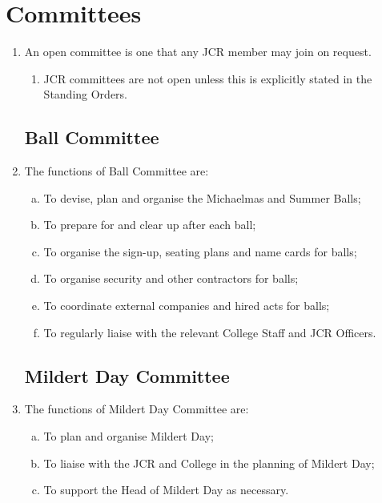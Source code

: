 \documentclass[12pt]{article}  %
\begin{document}
\section{Committees}
\begin{enumerate}
    \item An open committee is one that any JCR member may join on request.
    \begin{enumerate}
        \item JCR committees are not open unless this is explicitly stated in the Standing Orders.
    \end{enumerate}
    \subsection{Ball Committee}
    \item The functions of Ball Committee are:
    \begin{enumerate}[(a)]
        \item To devise, plan and organise the Michaelmas and Summer Balls;
        \item To prepare for and clear up after each ball;
        \item To organise the sign-up, seating plans and name cards for balls;
        \item To organise security and other contractors for balls;
        \item To coordinate external companies and hired acts for balls;
        \item To regularly liaise with the relevant College Staff and JCR Officers.
    \end{enumerate}
    \subsection{Mildert Day Committee}
    \item The functions of Mildert Day Committee are:
    \begin{enumerate}[(a)]
        \item To plan and organise Mildert Day;
        \item To liaise with the JCR and College in the planning of Mildert Day;
        \item To support the Head of Mildert Day as necessary.
    \end{enumerate}

\end{enumerate}
\end{document}
